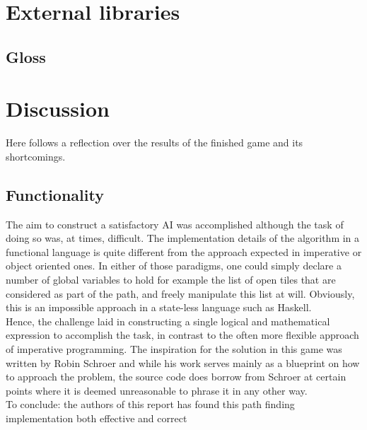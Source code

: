 \documentclass{article}
\begin{document}
\section{External libraries}
\subsection{Gloss}
\section{Discussion}
Here follows a reflection over the results of the finished game and its shortcomings.

\subsection{Functionality}
The aim to construct a satisfactory AI was accomplished although the task of doing so was, at times, difficult. The implementation details of the algorithm in a functional language is quite different from the approach expected in imperative or object oriented ones. In either of those paradigms, one could simply declare a number of global variables to hold for example the list of open tiles that are considered as part of the path, and freely manipulate this list at will. Obviously, this is an impossible approach in a state-less language such as Haskell.\\
\newline
Hence, the challenge laid in constructing a single logical and mathematical expression to accomplish the task, in contrast to the often more flexible approach of imperative programming. The inspiration for the solution in this game was written by Robin Schroer \cite{schroer} and while his work serves mainly as a blueprint on how to approach the problem, the source code does borrow from Schroer at certain points where it is deemed unreasonable to phrase it in any other way.\\
\newline
To conclude: the authors of this report has found this path finding implementation both effective and correct
\end{document}
